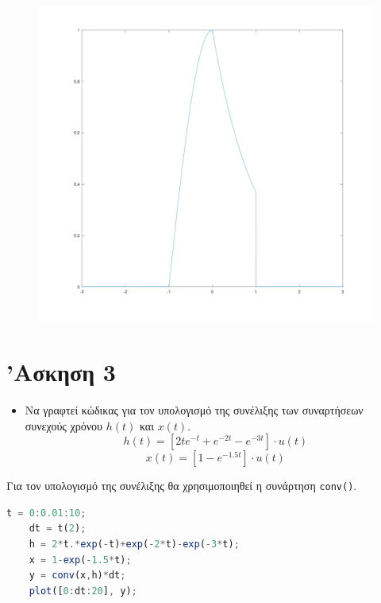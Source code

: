 \documentclass{article}
\begin{document}
\begin{figure}[H]
	\centering
	\includegraphics[width=\linewidth]{res/fig2.png}
\end{figure}

\section{'Ασκηση 3}

\begin{itemize}
	\item Να γραφτεί κώδικας για τον υπολογισμό της συνέλιξης των
		συναρτήσεων συνεχούς χρόνου $h(t)$ και $x(t)$.
		\[h(t) = [2te^{-t} + e^{-2t} - e^{-3t}] \cdot u(t)\]
		\[x(t) = [1 - e^{-1.5t}] \cdot u(t)\]
\end{itemize}

Για τον υπολογισμό της συνέλιξης θα χρησιμοποιηθεί η συνάρτηση 
\lstinline{conv()}.

\begin{lstlisting}[language=octave]
	t = 0:0.01:10;
	dt = t(2);
	h = 2*t.*exp(-t)+exp(-2*t)-exp(-3*t);
	x = 1-exp(-1.5*t);
	y = conv(x,h)*dt;
	plot([0:dt:20], y);
\end{lstlisting}
\end{document}
